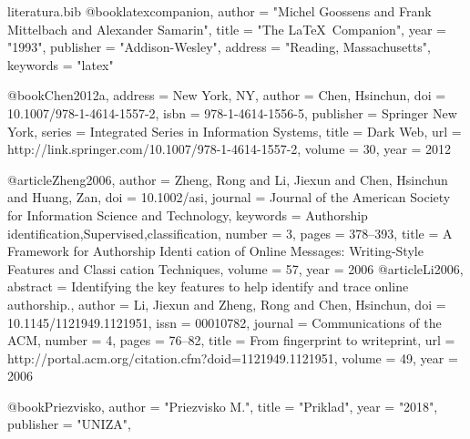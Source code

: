 
\begin{filecontents*}[overwrite]{literatura.bib}
@book{latexcompanion,
    author    = "Michel Goossens and Frank Mittelbach and Alexander Samarin",
    title     = "The \LaTeX\ Companion",
    year      = "1993",
    publisher = "Addison-Wesley",
    address   = "Reading, Massachusetts",
    keywords  = "latex"
}

@book{Chen2012a,
address = {New York, NY},
author = {Chen, Hsinchun},
doi = {10.1007/978-1-4614-1557-2},
isbn = {978-1-4614-1556-5},
publisher = {Springer New York},
series = {Integrated Series in Information Systems},
title = {{Dark Web}},
url = {http://link.springer.com/10.1007/978-1-4614-1557-2},
volume = {30},
year = {2012}
}

@article{Zheng2006,
author = {Zheng, Rong and Li, Jiexun and Chen, Hsinchun and Huang, Zan},
doi = {10.1002/asi},
journal = {Journal of the American Society for Information Science and Technology},
keywords = {Authorship identification,Supervised,classification},
number = {3},
pages = {378--393},
title = {{A Framework for Authorship Identi cation of Online Messages: Writing-Style Features and Classi cation Techniques}},
volume = {57},
year = {2006}
}
@article{Li2006,
abstract = {Identifying the key features to help identify and trace online authorship.},
author = {Li, Jiexun and Zheng, Rong and Chen, Hsinchun},
doi = {10.1145/1121949.1121951},
issn = {00010782},
journal = {Communications of the ACM},
number = {4},
pages = {76--82},
title = {{From fingerprint to writeprint}},
url = {http://portal.acm.org/citation.cfm?doid=1121949.1121951},
volume = {49},
year = {2006}
}

@book{Priezvisko,
    author    = "Priezvisko M.",
    title     = "Priklad",
    year      = "2018",
    publisher = "UNIZA",
}
\end{filecontents*}

